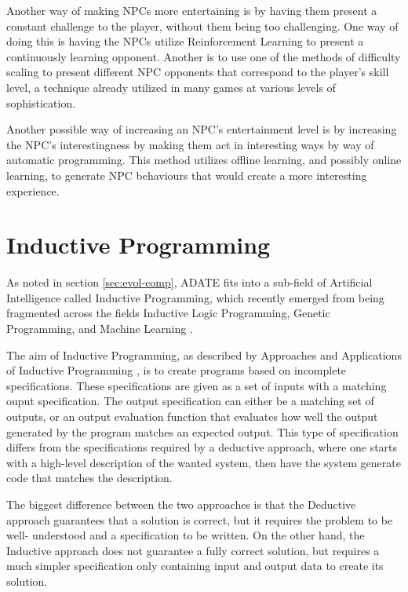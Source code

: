 Another way of making NPCs more entertaining is by having them present a
constant challenge to the player, without them being too challenging. One way of
doing this is having the NPCs utilize Reinforcement Learning
\citep{merrick2006motivated,sutton1998reinforcement} to present a continuously
learning opponent. Another is to use one of the methods of difficulty scaling to
present different NPC opponents that correspond to the player's skill level, a
technique already utilized in many games at various levels of sophistication.

Another possible way of increasing an NPC's entertainment level is by increasing
the NPC's interestingness by making them act in interesting ways by way of
automatic programming. This method utilizes offline learning, and possibly
online learning, to generate NPC behaviours that would create a more interesting
experience. \citet{yannakakis2005ai}

\section{Inductive Programming}
\label{cha:induct-progr}

As noted in section \ref{sec:evol-comp}, ADATE \citep{olsson1995inductive} fits
into a sub-field of Artificial Intelligence called Inductive Programming, which
recently emerged from being fragmented across the fields Inductive Logic
Programming, Genetic Programming, and Machine Learning
\citep{kitzelmann2010inductive}.

The aim of Inductive Programming, as described by Approaches and Applications of
Inductive Programming \citep{aaip2010intro}, is to create programs based on
incomplete specifications. These specifications are given as a set of inputs
with a matching ouput specification.  The output specification can either be a
matching set of outputs, or an output evaluation function that evaluates how
well the output generated by the program matches an expected output. This type
of specification differs from the specifications required by a deductive
approach, where one starts with a high-level description of the wanted system,
then have the system generate code that matches the description.

The biggest difference between the two approaches is that the Deductive approach
guarantees that a solution is correct, but it requires the problem to be well-
understood and a specification to be written. On the other hand, the Inductive
approach does not guarantee a fully correct solution, but requires a much
simpler specification only containing input and output data to create its
solution.

